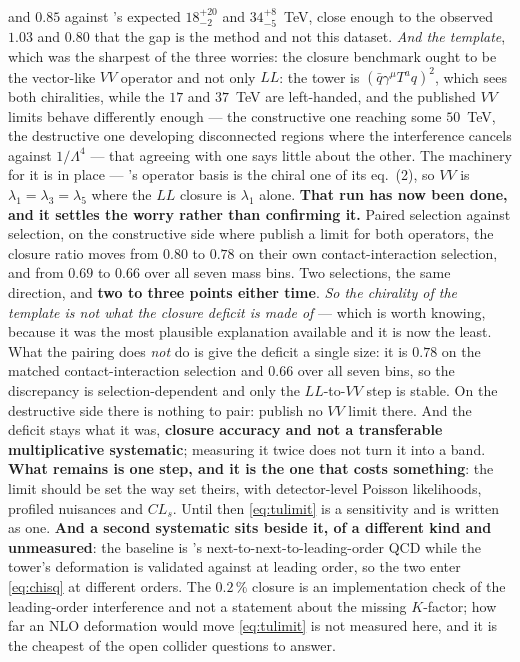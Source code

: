 \documentclass[11pt,a4paper]{article}
\begin{document}
\begin{itemize}
and $0.85$ against \cite{CMSangular}'s expected $18^{+20}_{-2}$ and $34^{+8}_{-5}$~TeV, close
enough to the observed $1.03$ and $0.80$ that the gap is the method and not this dataset.
\emph{And the template}, which was the sharpest of the three worries: the closure benchmark ought
to be the vector-like $VV$
operator and not only $LL$: the tower is $(\bar q\gamma^\mu T^aq)^2$, which sees both chiralities,
while the $17$ and $37$~TeV are left-handed, and the published $VV$ limits behave differently
enough --- the constructive one reaching some $50$~TeV, the destructive one developing
disconnected regions where the interference cancels against $1/\Lambda^4$ --- that agreeing with
one says little about the other. The machinery for it is in place --- \cite{CIJET}'s operator basis
is the chiral one of its eq.~(2), so $VV$ is $\lambda_1=\lambda_3=\lambda_5$ where the $LL$ closure
is $\lambda_1$ alone. \textbf{That run has now been done, and it settles the worry rather than
confirming it.} Paired selection against selection, on the constructive side where
\cite{CMSangular} publish a limit for both operators, the closure ratio moves from $0.80$ to
$0.78$ on their own contact-interaction selection, and from $0.69$ to $0.66$ over all seven mass
bins. Two selections, the same direction, and \textbf{two to three points either time}. \emph{So
the chirality of the template is not what the closure deficit is made of} --- which is worth
knowing, because it was the most plausible explanation available and it is now the least. What the
pairing does \emph{not} do is give the deficit a single size: it is $0.78$ on the matched
contact-interaction selection and $0.66$ over all seven bins, so the discrepancy is
selection-dependent and only the $LL$-to-$VV$ step is stable. On the destructive side
there is nothing to pair: \cite{CMSangular} publish no $VV$ limit there. And the deficit stays what
it was, \textbf{closure accuracy and not a transferable multiplicative systematic}; measuring it
twice does not turn it into a band. \textbf{What remains is one step, and it is the one that costs
something}: the limit should be set the way \cite{CMSangular} set theirs,
with detector-level Poisson likelihoods, profiled nuisances and $CL_s$. Until then
\eqref{eq:tulimit} is a sensitivity and is written as one. \textbf{And a second systematic sits
beside it, of a different kind and unmeasured}: the baseline is \cite{CMSangular}'s
next-to-next-to-leading-order QCD while the tower's deformation is validated against
\cite{CIJET} at leading order, so the two enter \eqref{eq:chisq} at different orders. The
$0.2\,\%$ closure is an implementation check of the leading-order interference and not a
statement about the missing $K$-factor; how far an NLO deformation would move
\eqref{eq:tulimit} is not measured here, and it is the cheapest of the open collider
questions to answer.


\end{itemize}
\end{document}
